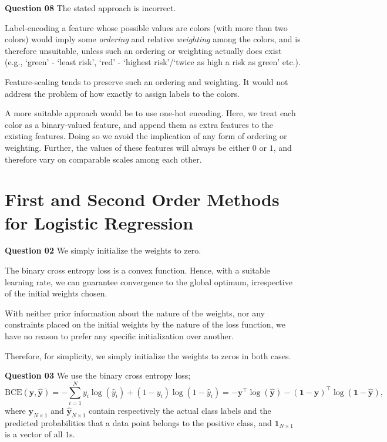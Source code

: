 \documentclass{article}[a4paper]
\begin{document}
	\textbf{Question 08} The stated approach is incorrect.
	
	Label-encoding a feature whose possible values are colors (with more than two colors) would imply some \textit{ordering} and relative \textit{weighting} among the colors, and is therefore unsuitable, unless such an ordering or weighting actually does exist (e.g., `green' - `least risk', `red' - `highest risk'/`twice as high a risk as green' etc.).
	
	Feature-scaling tends to preserve such an ordering and weighting. It would not address the problem of how exactly to assign labels to the colors.

	A more suitable approach would be to use one-hot encoding. Here, we treat each color as a binary-valued feature, and append them as extra features to the existing features. Doing so we avoid the implication of any form of ordering or weighting. Further, the values of these features will always be either $0$ or $1$, and therefore vary on comparable scales among each other.

	\section{First and Second Order Methods for Logistic Regression}

	\textbf{Question 02} We simply initialize the weights to zero.
	
	The binary cross entropy loss is a convex function. Hence, with a suitable learning rate, we can guarantee convergence to the global optimum, irrespective of the initial weights chosen.
	
	With neither prior information about the nature of the weights, nor any constraints placed on the initial weights by the nature of the loss function, we have no reason to prefer any specific initialization over another.
	
	Therefore, for simplicity, we simply initialize the weights to zeros in both cases.
	\medskip

	\textbf{Question 03} We use the binary cross entropy loss; \[
		\text{BCE}\left(\mathbf{y}, \hat{\mathbf{y}}\right)
		=
		-\sum_{i = 1}^N
			y_i \log\left( \hat{y}_i \right)
			+
			\left( 1 - y_i \right) \log\left( 1 - \hat{y}_i \right)
		=
		-\mathbf{y}^\top \log\left( \hat{\mathbf{y}} \right)
		-\left(\mathbf{1} - \mathbf{y}\right)^\top \log\left( \mathbf{1} - \hat{\mathbf{y}} \right),
	\]
	where $\mathbf{y}_{N \times 1}$ and $\hat{\mathbf{y}}_{N \times 1}$ contain respectively the actual class labels and the predicted probabilities that a data point belongs to the positive class, and $\mathbf{1}_{N \times 1}$ is a vector of all $1$s.
\end{document}
